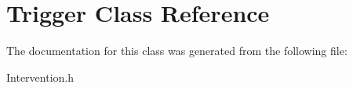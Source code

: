\hypertarget{classTrigger}{}\section{Trigger Class Reference}
\label{classTrigger}


The documentation for this class was generated from the following file\+:\begin{DoxyCompactItemize}
\item 
Intervention.\+h\end{DoxyCompactItemize}
